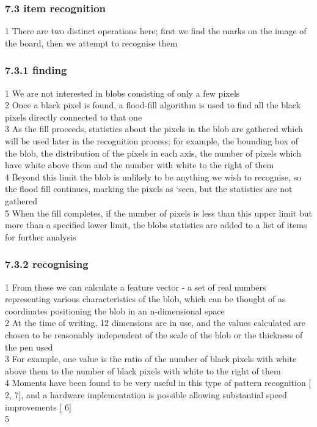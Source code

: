 \documentclass{beamer}
\begin{document}
\begin{frame}
\frametitle{7.3 item recognition}
1  There are two distinct operations here; first we find the marks on the image of the board, then we attempt to recognise them \\
\end{frame}
\begin{frame}
\frametitle{7.3.1 finding}
1  We are not interested in blobs consisting of only a few pixels \\2      Once a black pixel is found, a flood-fill algorithm is used to find all the black pixels directly connected to that one \\3  As the fill proceeds, statistics about the pixels in the blob are gathered which will be used later in the recognition process; for example, the bounding box of the blob, the distribution of the pixels in each axis, the number of pixels which have white above them and the number with white to the right of them \\4  Beyond this limit the blob is unlikely to be anything we wish to recognise, so the flood fill continues, marking the pixels as `seen, but the statistics are not gathered \\5  When the fill completes, if the number of pixels is less than this upper limit but more than a specified lower limit, the blobs statistics are added to a list of items for further analysis \\
\end{frame}
\begin{frame}
\frametitle{7.3.2 recognising}
1  From these we can calculate a    feature vector - a set of real numbers representing various characteristics of the blob, which can be thought of as coordinates positioning the blob in an n-dimensional space \\2  At the time of writing, 12 dimensions are in use, and the values calculated are chosen to be reasonably independent of the scale of the blob or the thickness of the pen used \\3  For example, one value is the ratio of the number of black pixels with white above them to the number of black pixels with white to the right of them \\4  Moments have been found to be very useful in this type of pattern recognition [    2,    7], and a hardware implementation is possible allowing substantial speed improvements [    6] \\5                               \\
\end{frame}
\end{document}
